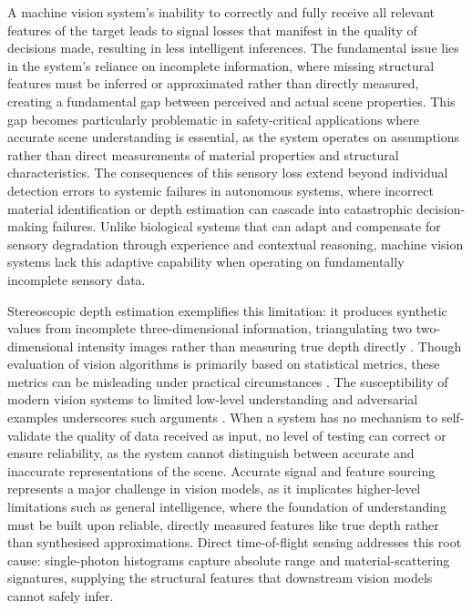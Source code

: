 \documentclass[12pt,a4paper,oneside]{report}
\begin{document}
A machine vision system's inability to correctly and fully receive all relevant features of the target leads to signal losses that manifest in the quality of decisions made, resulting in less intelligent inferences. The fundamental issue lies in the system's reliance on incomplete information, where missing structural features must be inferred or approximated rather than directly measured, creating a fundamental gap between perceived and actual scene properties. This gap becomes particularly problematic in safety-critical applications where accurate scene understanding is essential, as the system operates on assumptions rather than direct measurements of material properties and structural characteristics. The consequences of this sensory loss extend beyond individual detection errors to systemic failures in autonomous systems, where incorrect material identification or depth estimation can cascade into catastrophic decision-making failures. Unlike biological systems that can adapt and compensate for sensory degradation through experience and contextual reasoning, machine vision systems lack this adaptive capability when operating on fundamentally incomplete sensory data.

Stereoscopic depth estimation exemplifies this limitation: it produces synthetic values from incomplete three-dimensional information, triangulating two two-dimensional intensity images rather than measuring true depth directly \cite{boyer1989}. Though evaluation of vision algorithms is primarily based on statistical metrics, these metrics can be misleading under practical circumstances \cite{vanwinckelen2012}. The susceptibility of modern vision systems to limited low-level understanding and adversarial examples underscores such arguments \cite{rani2025}. When a system has no mechanism to self-validate the quality of data received as input, no level of testing can correct or ensure reliability, as the system cannot distinguish between accurate and inaccurate representations of the scene. Accurate signal and feature sourcing represents a major challenge in vision models, as it implicates higher-level limitations such as general intelligence, where the foundation of understanding must be built upon reliable, directly measured features like true depth rather than synthesised approximations. Direct time-of-flight sensing addresses this root cause: single-photon histograms capture absolute range and material-scattering signatures, supplying the structural features that downstream vision models cannot safely infer.
\end{document}
